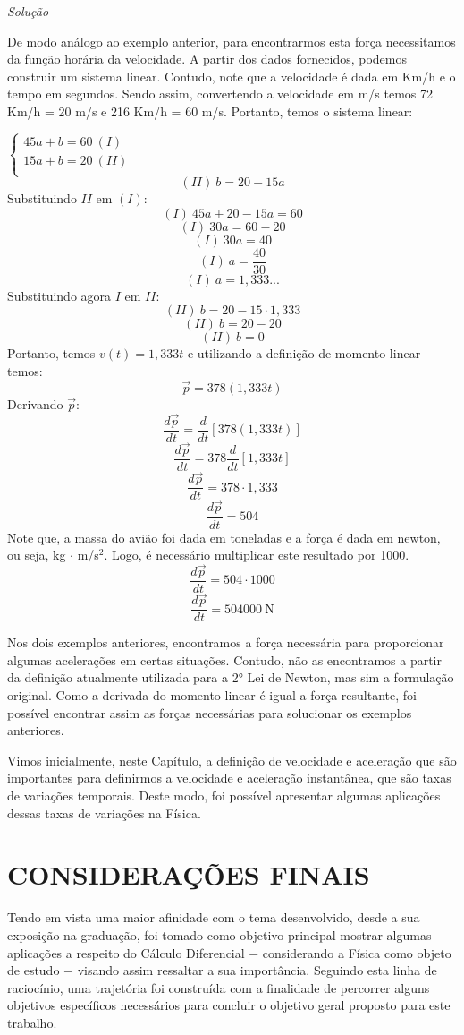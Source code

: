 \documentclass[
	12pt,				%
	openright,			%
    twoside,			%
	a4paper,			%
	chapter=TITLE,		%
	english,			%
	french,				%
	spanish,			%
	brazil				%
	]{abntex2}
\makeatletter
\renewenvironment{proof}[1][\proofname]{
	\par\pushQED{\qed}%
	\normalfont \topsep6\p@\@plus6\p@\relax
	\trivlist
	\item\relax
		{\itshape
			#1\@addpunct{.}}\hspace\labelsep\ignorespaces
}{%
	\popQED\endtrivlist\@endpefalse
}
\newenvironment{solution}{
	\begin{proof}[Solução]
}{%
	\end{proof}
}
\numberwithin{lema}{chapter}
\numberwithin{teorema}{chapter}
\numberwithin{definicao}{chapter}
\numberwithin{exemplo}{chapter}
\numberwithin{figure}{chapter}
\makeatother
\begin{document}
\begin{solution}
	De modo análogo ao exemplo anterior, para encontrarmos esta força necessitamos da função horária da velocidade. A partir dos dados fornecidos, podemos construir um sistema linear. Contudo, note que a velocidade é dada em Km/h e o tempo em segundos. Sendo assim, convertendo a velocidade em m/s temos 72 Km/h = 20 m/s e 216 Km/h = 60 m/s. Portanto, temos o sistema linear:
	
	$\begin{cases}
		45a + b = 60 \ (I)\\
		15a + b = 20 \ (II)\\
	\end{cases}$
	$$(II) \ b = 20 - 15a$$ 
	Substituindo $II$ em $(I)$:
	$$(I) \ 45a + 20 - 15a = 60$$
	$$(I) \ 30a = 60 - 20$$
	$$(I) \ 30a = 40$$
	$$(I) \ a = \dfrac{40}{30}$$
	$$(I) \ a = 1,333...$$
	Substituindo agora $I$ em $II$:
	$$(II) \ b = 20 - 15 \cdot 1,333$$ 
	$$(II) \ b = 20 - 20$$
	$$(II) \ b = 0$$
	Portanto, temos $v(t) = 1,333t$ e utilizando a definição de momento linear temos:
	$$\vec{p} = 378(1,333t)$$
	Derivando $\vec{p}$:
	$$\dfrac{d\vec{p}}{dt} = \dfrac{d}{dt}[378(1,333t)]$$
	$$\dfrac{d\vec{p}}{dt} = 378\dfrac{d}{dt}[1,333t]$$
	$$\dfrac{d\vec{p}}{dt} = 378 \cdot 1,333$$
	$$\dfrac{d\vec{p}}{dt} = 504$$
	Note que, a massa do avião foi dada em toneladas e a força é dada em newton, ou seja, kg $\cdot$ m/s$^{2}$. Logo, é necessário multiplicar este resultado por 1000.
	$$\dfrac{d\vec{p}}{dt} = 504 \cdot 1000$$
	$$\dfrac{d\vec{p}}{dt} = 504000 \ \text{N}$$
	
\end{solution}

Nos dois exemplos anteriores, encontramos a força necessária para proporcionar algumas acelerações em certas situações. Contudo, não as encontramos a partir da definição atualmente utilizada para a 2° Lei de Newton, mas sim a formulação original. Como a derivada do momento linear é igual a força resultante, foi possível encontrar assim as forças necessárias para solucionar os exemplos anteriores. 

Vimos inicialmente, neste Capítulo, a definição de velocidade e aceleração que são importantes para definirmos a velocidade e aceleração instantânea, que são taxas de variações temporais. Deste modo, foi possível apresentar algumas aplicações dessas taxas de variações na Física.
\chapter*[CONSIDERAÇÕES FINAIS]{CONSIDERAÇÕES FINAIS}
\thispagestyle{empty}
Tendo em vista uma maior afinidade com o tema desenvolvido, desde a sua exposição na graduação, foi tomado como objetivo principal mostrar algumas aplicações a respeito do Cálculo Diferencial $-$ considerando a Física como objeto de estudo $-$ visando assim ressaltar a sua importância. Seguindo esta linha de raciocínio, uma trajetória foi construída com a finalidade de percorrer alguns objetivos específicos necessários para concluir o objetivo geral proposto para este trabalho.
\end{document}
